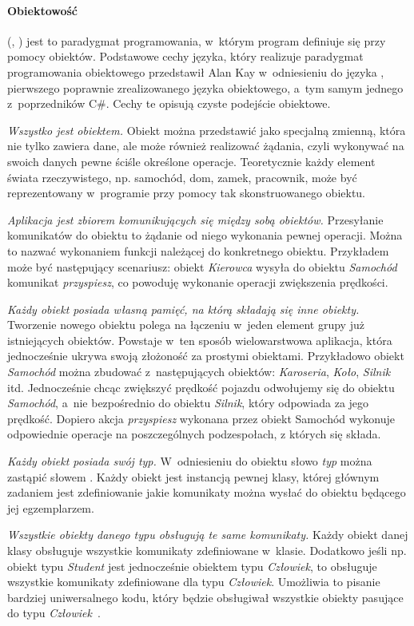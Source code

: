 \paragraph{Obiektowość}
 (, ) jest to paradygmat programowania, w~którym program definiuje się przy pomocy obiektów.
Podstawowe cechy języka, który realizuje paradygmat programowania obiektowego przedstawił Alan Kay w~odniesieniu do języka , pierwszego poprawnie zrealizowanego języka obiektowego, a~tym samym jednego z~poprzedników C\#. Cechy te opisują czyste podejście obiektowe.
\begin{description}
	\item \emph{Wszystko jest obiektem.} Obiekt można przedstawić jako specjalną zmienną, która nie tylko zawiera dane, ale może również realizować żądania, czyli wykonywać na swoich danych pewne ściśle określone operacje. Teoretycznie każdy element świata rzeczywistego, np. samochód, dom, zamek, pracownik, może być reprezentowany w~programie przy pomocy tak skonstruowanego obiektu.
	\item \emph{Aplikacja jest zbiorem komunikujących się między sobą obiektów.} Przesyłanie komunikatów do obiektu to żądanie od niego wykonania pewnej operacji. Można to nazwać wykonaniem funkcji należącej do konkretnego obiektu. Przykładem może być następujący scenariusz: obiekt \emph{Kierowca} wysyła do obiektu \emph{Samochód} komunikat \emph{przyspiesz}, co powoduję wykonanie operacji zwiększenia prędkości.
	\item \emph{Każdy obiekt posiada własną pamięć, na którą składają się inne obiekty.} Tworzenie nowego obiektu polega na łączeniu w~jeden element grupy już istniejących obiektów. Powstaje w~ten sposób wielowarstwowa aplikacja, która jednocześnie ukrywa swoją złożoność za prostymi obiektami. Przykładowo obiekt \emph{Samochód} można zbudować z~następujących obiektów: \emph{Karoseria}, \emph{Koło}, \emph{Silnik} itd. Jednocześnie chcąc zwiększyć prędkość pojazdu odwołujemy się do obiektu \emph{Samochód}, a~nie bezpośrednio do obiektu \emph{Silnik}, który odpowiada za jego prędkość. Dopiero akcja \emph{przyspiesz} wykonana przez obiekt Samochód wykonuje odpowiednie operacje na poszczególnych podzespołach, z których się składa.
	\item \emph{Każdy obiekt posiada swój typ.} W~odniesieniu do obiektu słowo \emph{typ} można zastąpić słowem . Każdy obiekt jest instancją pewnej klasy, której głównym zadaniem jest zdefiniowanie jakie komunikaty można wysłać do obiektu będącego jej egzemplarzem.
	\item \emph{Wszystkie obiekty danego typu obsługują te same komunikaty.} Każdy obiekt danej klasy obsługuje wszystkie komunikaty zdefiniowane w~klasie. Dodatkowo jeśli np. obiekt typu \emph{Student} jest jednocześnie obiektem typu \emph{Człowiek}, to obsługuje wszystkie komunikaty zdefiniowane dla typu \emph{Człowiek}. Umożliwia to pisanie bardziej uniwersalnego kodu, który będzie obsługiwał wszystkie obiekty pasujące do typu \emph{Człowiek}~\cite{cSharp:progr}.
\end{description}

